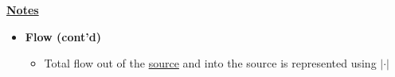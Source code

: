\documentclass[12pt]{article}
\begin{document}
\begin{enumerate}[1.]
\begin{enumerate}[a)]









        \bigskip

        \underline{\textbf{Notes}}

        \bigskip

        \begin{itemize}
            \item \textbf{Flow (cont'd)}

            \begin{itemize}
                \item Total flow out of the \ul{source} and into the source is represented using $\lvert \cdot \rvert$


\end{itemize}
\end{itemize}
\end{enumerate}
\end{enumerate}
\end{document}
